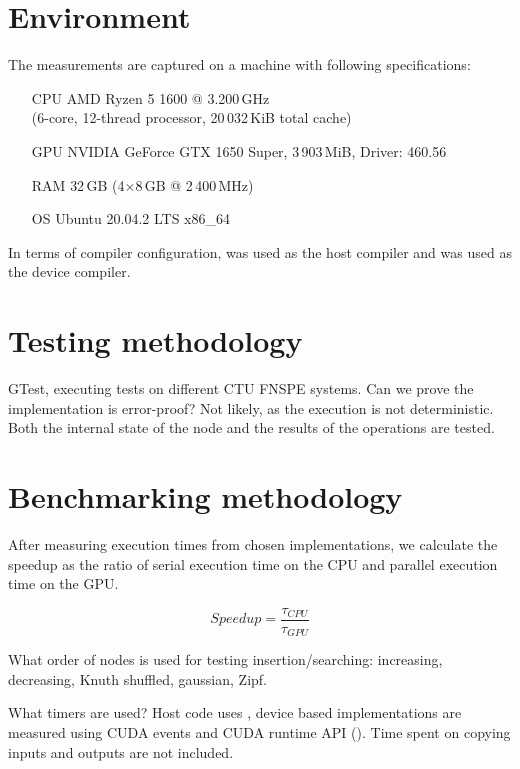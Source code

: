 \section{Environment}

The measurements are captured on a machine with following specifications:

\begin{itemize}
  \item[CPU]{AMD Ryzen 5 1600 @ 3.200\,GHz \\ (6-core, 12-thread processor, 20\,032\,KiB total cache)}
  \item[GPU]{NVIDIA GeForce GTX 1650 Super, 3\,903\,MiB, Driver: 460.56}
  \item[RAM]{32\,GB (4$\times$8\,GB @ 2\,400\,MHz)}
  \item[OS]{Ubuntu 20.04.2 LTS x86\_64}
\end{itemize}

In terms of compiler configuration,  was used as the host compiler and  was used as the device compiler.

\section{Testing methodology}

GTest, executing tests on different CTU FNSPE systems. Can we prove the implementation is error-proof? Not likely, as the execution is not deterministic. Both the internal state of the node and the results of the operations are tested.

\section{Benchmarking methodology}

After measuring execution times from chosen implementations, we calculate the speedup as the ratio of serial execution time on the CPU and parallel execution time on the GPU.

$$\mathit{Speedup} = \frac{\tau_{\mathit{CPU}}}{\tau_{\mathit{GPU}}}$$

What order of nodes is used for testing insertion/searching: increasing, decreasing, Knuth shuffled, gaussian, Zipf.

What timers are used? Host code uses , device based implementations are measured using CUDA events and CUDA runtime API (). Time spent on copying inputs and outputs are not included. 

